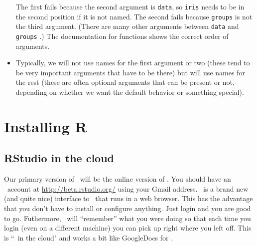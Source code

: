\begin{itemize}
\begin{knitrout}
\end{knitrout}

The first fails because the second argument is \verb!data!, so \verb!iris!
needs to be in the second position if it is not named.
The second fails because \verb!groups! is not the third argument.
(There are many other arguments between \verb!data! and \verb!groups! .)
The documentation for functions shows the correct order of arguments.
\item
Typically, we will not use names for the first argument or two (these tend to be 
very important arguments that have to be there) but will use names for the rest (these 
are often optional arguments that can be present or not, depending on whether we want 
the default behavior or something special).
\end{itemize}

\section{Installing R}

\subsection{RStudio in the cloud}
Our primary version of \R\ will be the online version of \Rstudio.  
You should have an \Rstudio\ account at \url{http://beta.rstudio.org/} 
using your Gmail address.
\Rstudio\ is a brand new (and quite nice) interface to \R\ that runs in a web browser.
This has the advantage that you don't have to install or configure anything.  Just login
and you are good to go.  Futhermore, \Rstudio\ will ``remember'' what you were doing so that
each time you login (even on a different machine) you can pick up right where you left off.
This is ``\R\ in the cloud" and works a bit like GoogleDocs for \R.


